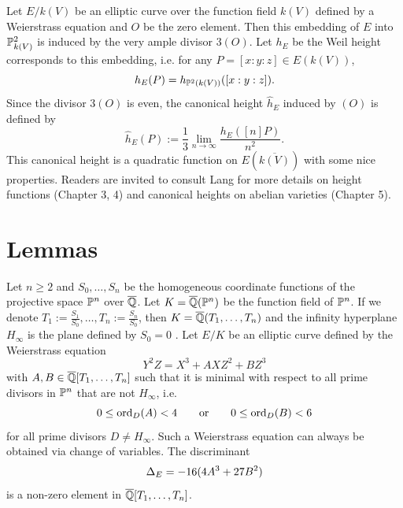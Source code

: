 \documentclass[12pt,reqno]{amsart}
\begin{document}
Let $E/k(V)$ be an elliptic curve over the function field $k(V)$ defined by a Weierstrass equation and $O$ be the zero element. Then this embedding of $E$ into $\mathbb{P}^2_{k(V)}$ is induced by the very ample divisor $3(O)$. Let $h_E$ be the Weil height corresponds to this embedding, i.e. for any $P=[x:y:z] \in E(k(V))$, 
$$h_E(P)=h_{\mathbb{P}^2(k(V))}([x:y:z]). $$  Since the divisor $3(O)$ is even, the canonical height $\hat{h}_E$ induced by $(O)$ is defined by
$$\hat{h}_{E}(P):=\frac{1}{3}\lim_{n \rightarrow \infty}\frac{h_{E}([n]P)}{n^2}. $$ 
This canonical height is a quadratic function on $E(\overline{k(V)})$ with some nice properties. Readers are invited to consult Lang \cite{LFD} for more details on height functions (Chapter 3, 4) and canonical heights on abelian varieties (Chapter 5).

\section{Lemmas}  \label{lemma}
Let $n \geq 2$ and $S_0, \ldots, S_n$ be the homogeneous coordinate functions of the projective space $\mathbb{P}^n$ over $\overline{\mathbb{Q}}$. Let $K=\overline{\mathbb{Q}}(\mathbb{P}^n)$ be the function field of $\mathbb{P}^n$. If we denote $T_1:=\frac{S_1}{S_0}, \ldots, T_n:=\frac{S_n}{S_0}$, then $K=\overline{\mathbb{Q}}(T_1, \ldots, T_n)$ and the infinity hyperplane $H_\infty$ is the plane defined by $S_0=0$ . Let $E/K$ be an elliptic curve defined by the Weierstrass equation 
\begin{equation}\label{WE} Y^2Z=X^3+AXZ^2+BZ^3 \end{equation} with $A,B \in \overline{\mathbb{Q}}[T_1, \ldots, T_n]$ such that it is minimal with respect to all prime divisors in $\mathbb{P}^n$ that are not $H_\infty$, i.e. $$0\leq \operatorname{ord}_D(A) <4 \qquad \text{or}\qquad  0\leq \operatorname{ord}_D(B)<6  $$  for all prime divisors $D \neq H_\infty$. Such a Weierstrass equation can always be obtained via change of variables. The discriminant 
$$\Delta_E=-16(4A^3+27B^2) $$ is a non-zero element in $\overline{\mathbb{Q}}[T_1, \ldots, T_n]$. %
\end{document}
